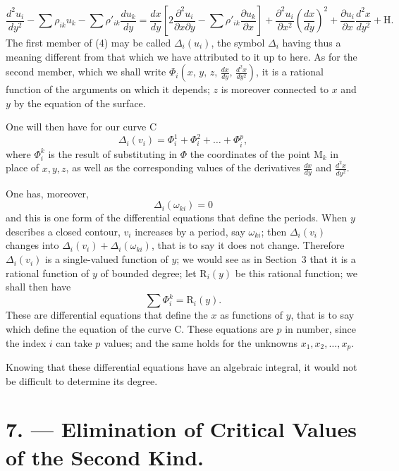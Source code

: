 \documentclass{article}
\begin{document}
\[
\frac{d^{2}u_{i}}{dy^{2}} - \sum \rho_{ik} u_{k} - \sum \rho'_{ik}\frac{du_{k}}{dy} = \frac{dx}{dy}\left[ 2 \frac{\partial^{2}u_{i}}{\partial x \partial y} - \sum \rho'_{ik}\frac{\partial u_{k}}{\partial x} \right] + \frac{\partial^{2}u_{i}}{\partial x^{2}}\left(\frac{dx}{dy}\right)^{2} + \frac{\partial u_{i}}{\partial x}\frac{d^{2}x}{dy^{2}} + \mathrm{H}. \tag{4}
\]
The first member of (4) may be called $\Delta_{i}(u_{i})$, the symbol $\Delta_{i}$ having thus a meaning different from that which we have attributed to it up to here. As for the second member, which we shall write $\Phi_{i}\left(x,\, y,\, z,\, \frac{dx}{dy},\, \frac{d^{2}x}{dy^{2}}\right)$, it is a rational function of the arguments on which it depends; $z$ is moreover connected to $x$ and $y$ by the equation of the surface.

One will then have for our curve $\mathrm{C}$
\[
\Delta_{i}(v_{i}) = \Phi_{i}^{1} + \Phi_{i}^{2} + \ldots + \Phi_{i}^{p},
\]
where $\Phi_{i}^{k}$ is the result of substituting in $\Phi$ the coordinates of the point $\mathrm{M}_{k}$
in place of $x, y, z$, as well as the corresponding values of the derivatives $\frac{dx}{dy}$ and $\frac{d^{2}x}{dy^{2}}$.

One has, moreover,
\[
\Delta_{i}(\omega_{ki}) = 0
\]
and this is one form of the differential equations that define the periods. When $y$ describes a closed contour, $v_{i}$ increases by a period, say $\omega_{ki}$; then $\Delta_{i}(v_{i})$ changes into $\Delta_{i}(v_{i}) + \Delta_{i}(\omega_{ki})$, that is to say it does not change. Therefore $\Delta_{i}(v_{i})$ is a single-valued function of $y$; we would see as in Section~3 that it is a rational function of $y$ of bounded degree; let $\mathrm{R}_{i}(y)$ be this rational function; we shall then have
\[
\sum \Phi_{i}^{k} = \mathrm{R}_{i}(y). \tag{5}
\]
These are differential equations that define the $x$ as functions of $y$, that is to say which define the equation of the curve $\mathrm{C}$. These equations are $p$ in number, since the index $i$ can take $p$ values; and the same holds for the unknowns $x_{1}, x_{2}, \ldots, x_{p}$.

Knowing that these differential equations have an algebraic integral, it would not be difficult to determine its degree.

\section*{7. --- Elimination of Critical Values of the Second Kind.}
\end{document}

